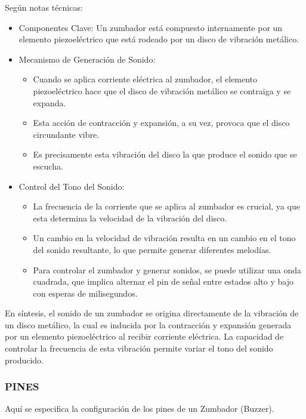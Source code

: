\documentclass{report}
\begin{document}
Según notas técnicas:
\begin{itemize}
    \item Componentes Clave: Un zumbador está compuesto internamente por un elemento piezoeléctrico que está rodeado por un disco de vibración metálico.
    \item Mecanismo de Generación de Sonido:
    \begin{itemize}
        \item Cuando se aplica corriente eléctrica al zumbador, el elemento piezoeléctrico hace que el disco de vibración metálico se contraiga y se expanda.
        \item Esta acción de contracción y expansión, a su vez, provoca que el disco circundante vibre.
        \item Es precisamente esta vibración del disco la que produce el sonido que se escucha.
    \end{itemize}
    \item Control del Tono del Sonido:
    \begin{itemize}
        \item La frecuencia de la corriente que se aplica al zumbador es crucial, ya que esta determina la velocidad de la vibración del disco.
        \item Un cambio en la velocidad de vibración resulta en un cambio en el tono del sonido resultante, lo que permite generar diferentes melodías.
        \item Para controlar el zumbador y generar sonidos, se puede utilizar una onda cuadrada, que implica alternar el pin de señal entre estados alto 
        y bajo con esperas de milisegundos.
    \end{itemize}
\end{itemize}
En síntesis, el sonido de un zumbador se origina directamente de la vibración de un disco metálico, la cual es inducida por la contracción y expansión 
generada por un elemento piezoeléctrico al recibir corriente eléctrica. La capacidad de controlar la frecuencia de esta vibración permite variar el 
tono del sonido producido.

\subsubsection{PINES}
Aquí se especifica la configuración de los pines de un Zumbador (Buzzer).
\end{document}
